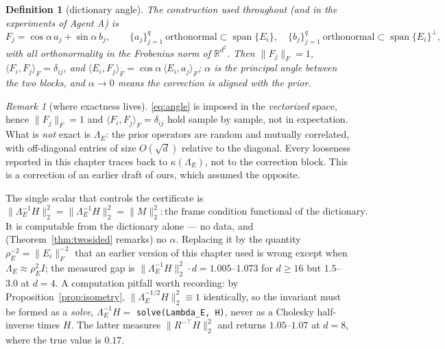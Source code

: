 \documentclass[11pt]{article}
\newtheorem{definition}[theorem]{Definition}
\theoremstyle{remark}
\newtheorem{remark}{Remark}[section]
\newcommand{\Le}{\Lambda_E}
\newcommand{\Cnorm}{\bigl\|\Le^{-1}H\bigr\|_2^2}
\begin{document}
\begin{definition}[dictionary angle]\label{def:angle}
The construction used throughout (and in the experiments of Agent A) is
\begin{equation}\label{eq:angle}
  F_j=\cos\alpha\, a_j+\sin\alpha\, b_j,\qquad
  \{a_j\}_{j=1}^{q}\ \text{orthonormal}\subset\operatorname{span}\{E_i\},\quad
  \{b_j\}_{j=1}^{q}\ \text{orthonormal}\subset\operatorname{span}\{E_i\}^{\perp},
\end{equation}
with all orthonormality in the Frobenius norm of $\mathbb{R}^{d^2}$.
Then $\|F_j\|_F=1$, $\langle F_i,F_j\rangle_F=\delta_{ij}$, and
$\langle E_i,F_j\rangle_F=\cos\alpha\,\langle E_i,a_j\rangle_F$; $\alpha$ is the
principal angle between the two blocks, and $\alpha\to0$ means the correction is
\emph{aligned} with the prior.
\end{definition}

\begin{remark}[where exactness lives]\label{rem:exact}
\eqref{eq:angle} is imposed in the \emph{vectorized} space, hence
$\|F_j\|_F=1$ and $\langle F_i,F_j\rangle_F=\delta_{ij}$ hold sample by sample, not in
expectation. What is \emph{not} exact is $\Le$: the prior operators are random and
mutually correlated, with off-diagonal entries of size $O(\sqrt d)$ relative to the
diagonal. Every looseness reported in this chapter traces back to $\kappa(\Le)$, not to
the correction block. This is a correction of an earlier draft of ours, which assumed
the opposite.
\end{remark}

The single scalar that controls the certificate is
\begin{equation}\label{eq:frameinv}
  \Cnorm=\|\Le^{-1}H\|_2^2=\|M\|_2^2 : \text{the frame condition functional of the dictionary}.
\end{equation}
It is computable from the dictionary alone --- no data, and (Theorem~\ref{thm:twosided}
remarks) no $\alpha$. Replacing it by the quantity $\rho_E^{-2}=\|E_i\|_F^{-2}$ that an
earlier version of this chapter used is wrong except when $\Le\approx\rho_E^2 I$; the
measured gap is $\Cnorm\cdot d=1.005$--$1.073$ for $d\ge16$ but $1.5$--$3.0$ at $d=4$.
A computation pitfall worth recording: by Proposition~\ref{prop:isometry},
$\|\Le^{-1/2}H\|_2^2\equiv1$ identically, so the invariant must be formed as a
\emph{solve}, $\Le^{-1}H=$ \texttt{solve(Lambda\_E, H)}, never as a Cholesky
half-inverse times $H$. The latter measures $\|R^{-\top}H\|_2^2$ and returns
$1.05$--$1.07$ at $d=8$, where the true value is $0.17$.
\end{document}
